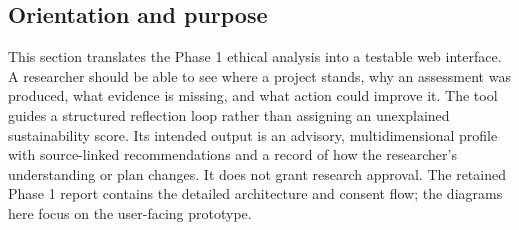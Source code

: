 \documentclass[11pt,a4paper]{article}
\begin{document}


\clearpage
\subsection{Orientation and purpose}
This section translates the Phase 1 ethical analysis into a testable web interface. A researcher should be able to see where a project stands, why an assessment was produced, what evidence is missing, and what action could improve it. The tool guides a structured reflection loop rather than assigning an unexplained sustainability score. Its intended output is an advisory, multidimensional profile with source-linked recommendations and a record of how the researcher's understanding or plan changes. It does not grant research approval. The retained Phase 1 report contains the detailed architecture and consent flow; the diagrams here focus on the user-facing prototype.
\end{document}
